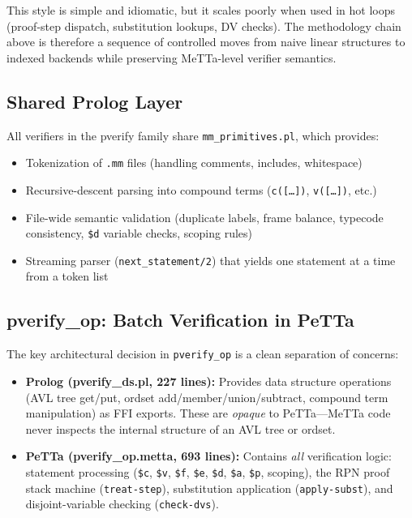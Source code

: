 \documentclass[11pt]{article}
\begin{document}
This style is simple and idiomatic, but it scales poorly when used in
hot loops (proof-step dispatch, substitution lookups, DV checks). The
methodology chain above is therefore a sequence of controlled moves
from naive linear structures to indexed backends while preserving
MeTTa-level verifier semantics.

\subsection{Shared Prolog Layer}

All verifiers in the pverify family share
\texttt{mm\_primitives.pl}, which provides:
\begin{itemize}[leftmargin=2em]
  \item Tokenization of \texttt{.mm} files (handling comments,
    includes, whitespace)
  \item Recursive-descent parsing into compound terms
    (\texttt{c([\ldots])}, \texttt{v([\ldots])}, etc.)
  \item File-wide semantic validation (duplicate labels, frame
    balance, typecode consistency, \texttt{\$d} variable checks,
    scoping rules)
  \item Streaming parser (\texttt{next\_statement/2}) that yields
    one statement at a time from a token list
\end{itemize}

\subsection{pverify\_op: Batch Verification in PeTTa}

The key architectural decision in \texttt{pverify\_op} is a clean
separation of concerns:

\begin{itemize}[leftmargin=2em]
  \item \textbf{Prolog (pverify\_ds.pl, 227 lines):} Provides
    data structure operations (AVL tree get/put, ordset
    add/member/union/subtract, compound term manipulation) as FFI
    exports.  These are \emph{opaque} to PeTTa---MeTTa code never
    inspects the internal structure of an AVL tree or ordset.
  \item \textbf{PeTTa (pverify\_op.metta, 693 lines):} Contains
    \emph{all} verification logic: statement processing
    (\texttt{\$c}, \texttt{\$v}, \texttt{\$f}, \texttt{\$e},
    \texttt{\$d}, \texttt{\$a}, \texttt{\$p}, scoping), the
    RPN proof stack machine (\texttt{treat-step}), substitution
    application (\texttt{apply-subst}), and
    disjoint-variable checking (\texttt{check-dvs}).
\end{itemize}
\end{document}
